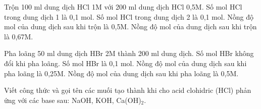 \documentclass[Main.tex]{subfiles}
\begin{document}
    \begin{ex}
    Trộn 100 ml dung dịch HCl 1M với 200 ml dung dịch HCl 0{,}5M.
    \choiceTF
    {\True Số mol HCl trong dung dịch 1 là 0{,}1 mol.}
    {\True Số mol HCl trong dung dịch 2 là 0{,}1 mol.}
    {Nồng độ mol của dung dịch sau khi trộn là 0{,}5M.}
    {\True Nồng độ mol của dung dịch sau khi trộn là 0{,}67M.}
    \end{ex}
    
    \begin{ex}
    Pha loãng 50 ml dung dịch HBr 2M thành 200 ml dung dịch.
    \choiceTF
    {\True Số mol HBr không đổi khi pha loãng.}
    {\True Số mol HBr là 0{,}1 mol.}
    {Nồng độ mol của dung dịch sau khi pha loãng là 0{,}25M.}
    {\True Nồng độ mol của dung dịch sau khi pha loãng là 0{,}5M.}
    \end{ex}
    
    \begin{bt}
    Viết công thức và gọi tên các muối tạo thành khi cho acid clohidric (HCl) phản ứng với các base sau: NaOH, KOH, Ca(OH)$_2$.
    \end{bt}
\end{document}
